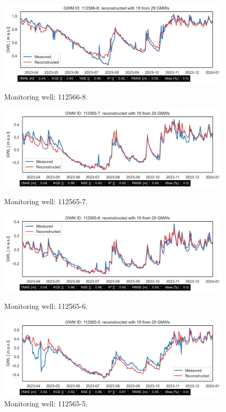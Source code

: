 \begin{figure}[htbp]
    \begin{minipage}{0.48\textwidth}
        \centering
        \includegraphics[width=\linewidth]{GWM_reconstructed112566-8.png}
        \caption{Monitoring well: 112566-8.}
        \label{fig:gwm-112566-8}
    \end{minipage}\hfill
    \begin{minipage}{0.48\textwidth}
        \centering
        \includegraphics[width=\linewidth]{GWM_reconstructed112565-7.png}
        \caption{Monitoring well: 112565-7.}
        \label{fig:gwm-112565-7}
    \end{minipage}

    \begin{minipage}{0.48\textwidth}
        \centering
        \includegraphics[width=\linewidth]{GWM_reconstructed112565-6.png}
        \caption{Monitoring well: 112565-6.}
        \label{fig:gwm-112565-6}
    \end{minipage}\hfill
    \begin{minipage}{0.48\textwidth}
        \centering
        \includegraphics[width=\linewidth]{GWM_reconstructed112565-5.png}
        \caption{Monitoring well: 112565-5.}
        \label{fig:gwm-112565-5}
    \end{minipage}
\end{figure}

